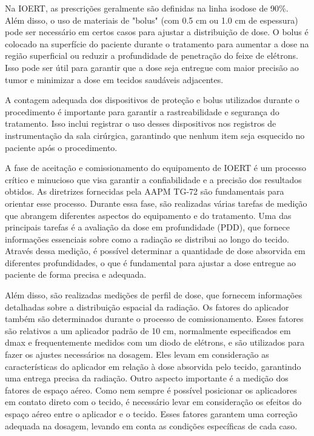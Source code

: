 \documentclass[11pt,a4paper]{article}
\begin{document}
	Na IOERT, as prescrições geralmente são definidas na linha isodose de 90\%. Além disso, o uso de materiais de "bolus" (com 0.5 cm ou 1.0 cm de espessura) pode ser necessário em certos casos para ajustar a distribuição de dose. O bolus é colocado na superfície do paciente durante o tratamento para aumentar a dose na região superficial ou reduzir a profundidade de penetração do feixe de elétrons. Isso pode ser útil para garantir que a dose seja entregue com maior precisão ao tumor e minimizar a dose em tecidos saudáveis adjacentes.

	A contagem adequada dos dispositivos de proteção e bolus utilizados durante o procedimento é importante para garantir a rastreabilidade e segurança do tratamento. Isso inclui registrar o uso desses dispositivos nos registros de instrumentação da sala cirúrgica, garantindo que nenhum item seja esquecido no paciente após o procedimento.

	A fase de aceitação e comissionamento do equipamento de IOERT é um processo crítico e minucioso que visa garantir a confiabilidade e a precisão dos resultados obtidos. As diretrizes fornecidas pela AAPM TG-72 são fundamentais para orientar esse processo. Durante essa fase, são realizadas várias tarefas de medição que abrangem diferentes aspectos do equipamento e do tratamento. Uma das principais tarefas é a avaliação da dose em profundidade (PDD), que fornece informações essenciais sobre como a radiação se distribui ao longo do tecido. Através dessa medição, é possível determinar a quantidade de dose absorvida em diferentes profundidades, o que é fundamental para ajustar a dose entregue ao paciente de forma precisa e adequada. 

	Além disso, são realizadas medições de perfil de dose, que fornecem informações detalhadas sobre a distribuição espacial da radiação. Os fatores do aplicador também são determinados durante o processo de comissionamento. Esses fatores são relativos a um aplicador padrão de 10 cm,  normalmente especificados em dmax e frequentemente medidos com um diodo de elétrons, e são utilizados para fazer os ajustes necessários na dosagem. Eles levam em consideração as características do aplicador em relação à dose absorvida pelo tecido, garantindo uma entrega precisa da radiação. Outro aspecto importante é a medição dos fatores de espaço aéreo. Como nem sempre é possível posicionar os aplicadores em contato direto com o tecido, é necessário levar em consideração os efeitos do espaço aéreo entre o aplicador e o tecido. Esses fatores garantem uma correção adequada na dosagem, levando em conta as condições específicas de cada caso.
\end{document}

